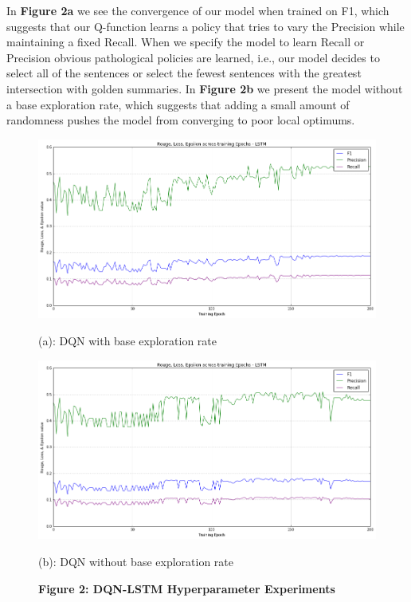 \documentclass[12pt]{article}
\begin{document}
In \textbf{Figure 2a} we see the convergence of our model when trained on F1, which suggests that our Q-function learns a policy that tries to vary the Precision while maintaining a fixed Recall. When we specify the model to learn Recall or Precision obvious pathological policies are learned, i.e., our model decides to select all of the sentences or select the fewest sentences with the greatest intersection with golden summaries. In  \textbf{Figure 2b} we present the model without a base exploration rate, which suggests that adding a small amount of randomness pushes the model from converging to poor local optimums.  

\begin{figure}[!tbp]
  \centering
  \begin{minipage}[b]{0.4\textwidth}
    \captionsetup{labelformat=empty}
    \includegraphics[width=\textwidth]{dqn_with_base}
    \caption{ \scriptsize (a): DQN with base exploration rate}
  \end{minipage}
  \hfill
  \begin{minipage}[b]{0.4\textwidth}
    \captionsetup{labelformat=empty}
    \includegraphics[width=\textwidth]{dqn_no_base}
    \caption{\scriptsize (b): DQN without base exploration rate}
  \end{minipage}
    \captionsetup{labelformat=empty}
    \caption{\textbf{Figure 2: DQN-LSTM Hyperparameter Experiments}}
\end{figure}
\end{document}
